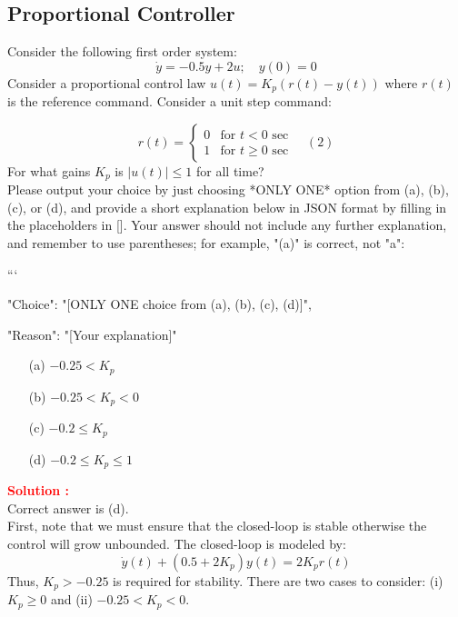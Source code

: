\documentclass[12pt]{article}
\begin{document}
\clearpage

\subsection{Proportional Controller}

Consider the following first order system:
\begin{equation}
\dot{y} = -0.5y + 2u; \quad y(0) = 0
\end{equation}
Consider a proportional control law \(u(t) = K_p(r(t) - y(t))\) where \(r(t)\) is the reference command. Consider a unit step command:

    \[ r(t) =
    \begin{cases} 
    0 & \text{for } t < 0 \text{ sec} \\
    1 & \text{for } t \geq 0 \text{ sec}
    \end{cases}
    \quad (2)
    \]
For what gains \(K_p\) is \(\lvert u(t) \rvert \leq 1\) for all time?\\
Please output your choice by just choosing *ONLY ONE* option from (a), (b), (c), or (d), and provide a short explanation below in JSON format by filling in the placeholders in []. Your answer should not include any further explanation, and remember to use parentheses; for example, "(a)" is correct, not "a":

```
{

"Choice": "[ONLY ONE choice from (a), (b), (c), (d)]",

"Reason": "[Your explanation]"

}

\begin{itemize}
    \item[(a)] \(-0.25 < K_p \)
    \item[(b)] \(-0.25 < K_p < 0\)
    \item[(c)] \(-0.2 \leq K_p\)
    \item[(d)] \(-0.2 \leq K_p \leq 1\)
\end{itemize}

\textbf{\textcolor{red}{Solution :}} \\
Correct answer is (d).\\
First, note that we must ensure that the closed-loop is stable otherwise the control will grow unbounded. The closed-loop is modeled by:
\begin{equation}
\dot{y}(t) + (0.5 + 2K_p)y(t) = 2K_pr(t)
\end{equation}
Thus, \(K_p > -0.25\) is required for stability. There are two cases to consider: (i) \(K_p \geq 0\) and (ii) \(-0.25 < K_p < 0\).
\end{document}
